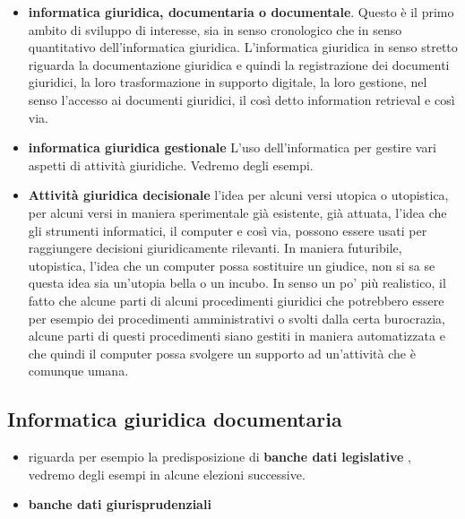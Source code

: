 \begin{itemize}
    \item \textbf{informatica giuridica, documentaria o documentale}. Questo è il primo ambito di sviluppo di interesse, sia in senso cronologico che in senso quantitativo dell'informatica giuridica. L'informatica giuridica in senso stretto riguarda la documentazione giuridica e quindi la registrazione dei documenti giuridici, la loro trasformazione in supporto digitale, la loro gestione, nel senso l'accesso ai documenti giuridici, il così detto information retrieval e così via. 
    \item \textbf{informatica giuridica gestionale} L'uso dell'informatica per gestire vari aspetti di attività giuridiche. Vedremo degli esempi.
    \item \textbf{Attività giuridica decisionale} l'idea per alcuni versi utopica o utopistica, per alcuni versi in maniera sperimentale già esistente, già attuata, l'idea che gli strumenti informatici, il computer e così via, possono essere usati per raggiungere decisioni giuridicamente rilevanti. In maniera futuribile, utopistica, l'idea che un computer possa sostituire un giudice, non si sa se questa idea sia un'utopia bella o un incubo. In senso un po' più realistico, il fatto che alcune parti di alcuni procedimenti giuridici che potrebbero essere per esempio dei procedimenti amministrativi o svolti dalla certa burocrazia, alcune parti di questi procedimenti siano gestiti in maniera automatizzata e che quindi il computer possa svolgere un supporto ad un'attività che è comunque umana.
\end{itemize}

\subsection{Informatica giuridica documentaria}
\begin{itemize}
    \item riguarda per esempio la predisposizione di \textbf{banche dati legislative }, vedremo degli esempi in alcune elezioni successive.
    \item \textbf{banche dati giurisprudenziali} 
\end{itemize}


